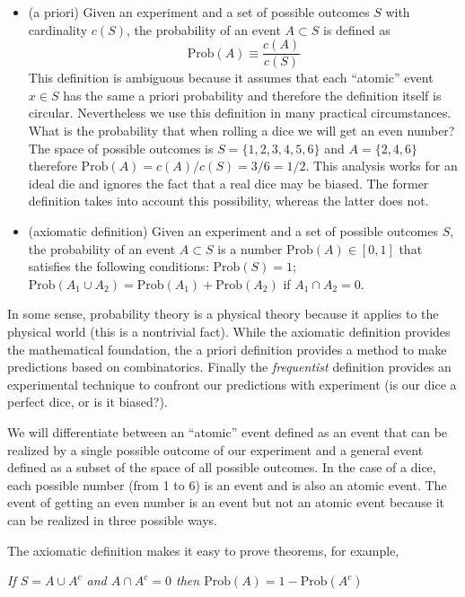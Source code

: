 \documentclass[justified,sixbynine]{tufte-book}
\theoremstyle{plain}%
\theoremstyle{definition}
\theoremstyle{remark}
\begin{document}
\begin{fullwidth}
\begin{itemize}
\item  (a priori) Given an experiment and a set of possible outcomes $S$
with cardinality $c(S)$, the probability of an event $A\subset S$ is defined
as
\begin{equation}
\textrm{Prob}(A)\equiv \frac{c(A)}{c(S)}
\end{equation}
This definition is ambiguous because it assumes that each ``atomic'' event $%
x\in S$ has the same a priori probability and therefore the definition
itself is circular. Nevertheless we use this definition in many practical
circumstances. What is the probability that when rolling a dice we will get an even
number? The space of possible outcomes is $S=\{1,2,3,4,5,6\}$ and $A=\{2,4,6\}
$ therefore $\textrm{Prob}(A)=c(A)/c(S)=3/6=1/2$. This analysis works for an ideal die
and ignores the fact that a real dice may be biased. The former definition
takes into account this possibility, whereas the latter does not.

\item  (axiomatic definition) Given an experiment and a set of possible
outcomes $S$, the probability of an event $A\subset S$ is a number $\textrm{Prob}(A)\in
[0,1]$ that satisfies the following conditions: $\textrm{Prob}(S)=1$; $\textrm{Prob}(A_1\cup
A_2)=\textrm{Prob}(A_1)+\textrm{Prob}(A_2)$ if $A_1\cap A_2=0$.
\end{itemize}

In some sense, probability theory is a physical theory because it applies to
the physical world (this is a nontrivial fact). While the axiomatic
definition provides the mathematical foundation, the a priori
definition provides a method to make predictions based on combinatorics.
Finally the {\em frequentist} definition provides an experimental
technique to confront our predictions with experiment (is our dice a perfect
dice, or is it biased?).

We will differentiate between an ``atomic'' event defined as an event that
can be realized by a single possible outcome of our experiment and a general
event defined as a subset of the space of all possible outcomes. In the case
of a dice, each possible number (from 1 to 6) is an event and is also an
atomic event. The event of getting an even number is an event but not an
atomic event because it can be realized in three possible ways.

The axiomatic definition makes it easy to prove theorems, for example,

{\it If $S=A\cup A^c$ and $A\cap A^c=0$ then $\textrm{Prob}(A)=1-\textrm{Prob}(A^c)$}


\end{fullwidth}
\end{document}
